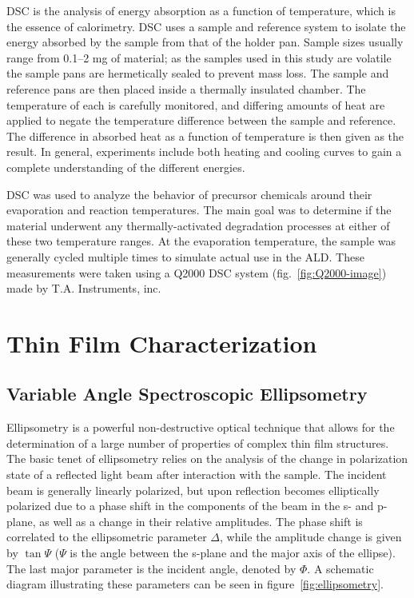 DSC is the analysis of energy absorption as a function of temperature, which is the essence of calorimetry. DSC uses a sample and reference system to isolate the energy absorbed by the sample from that of the holder pan. Sample sizes usually range from 0.1--2 mg of material; as the samples used in this study are volatile the sample pans are hermetically sealed to prevent mass loss. The sample and reference pans are then placed inside a thermally insulated chamber. The temperature of each is carefully monitored, and differing amounts of heat are applied to negate the temperature difference between the sample and reference. The difference in absorbed heat as a function of temperature is then given as the result. In general, experiments include both heating and cooling curves to gain a complete understanding of the different energies. 
	
DSC was used to analyze the behavior of precursor chemicals around their evaporation and reaction temperatures. The main goal was to determine if the material underwent any thermally-activated degradation processes at either of these two temperature ranges. At the evaporation temperature, the sample was generally cycled multiple times to simulate actual use in the ALD. These measurements were taken using a Q2000 DSC system (fig.~\vref{fig:Q2000-image}) made by T.A. Instruments, inc.	


\section{Thin Film Characterization}
\label{sec:Charact-ThinFilm}


	
\subsection{Variable Angle Spectroscopic Ellipsometry}

Ellipsometry is a powerful non-destructive optical technique that allows for the determination of a large number of properties of complex thin film structures. The basic tenet of ellipsometry relies on the analysis of the change in polarization state of a reflected light beam after interaction with the sample. The incident beam is generally linearly polarized, but upon reflection becomes elliptically polarized due to a phase shift in the components of the beam in the s- and p-plane, as well as a change in their relative amplitudes. The phase shift is correlated to the ellipsometric parameter $\Delta$, while the amplitude change is given by $\tan\Psi$ ($\Psi$ is the angle between the s-plane and the major axis of the ellipse). The last major parameter is the incident angle, denoted by $\Phi$. A schematic diagram illustrating these parameters can be seen in figure~\vref{fig:ellipsometry}. 

